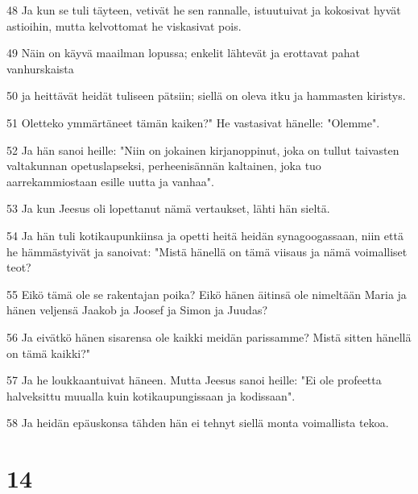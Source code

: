 \par 48 Ja kun se tuli täyteen, vetivät he sen rannalle, istuutuivat ja kokosivat hyvät astioihin, mutta kelvottomat he viskasivat pois.
\par 49 Näin on käyvä maailman lopussa; enkelit lähtevät ja erottavat pahat vanhurskaista
\par 50 ja heittävät heidät tuliseen pätsiin; siellä on oleva itku ja hammasten kiristys.
\par 51 Oletteko ymmärtäneet tämän kaiken?" He vastasivat hänelle: "Olemme".
\par 52 Ja hän sanoi heille: "Niin on jokainen kirjanoppinut, joka on tullut taivasten valtakunnan opetuslapseksi, perheenisännän kaltainen, joka tuo aarrekammiostaan esille uutta ja vanhaa".
\par 53 Ja kun Jeesus oli lopettanut nämä vertaukset, lähti hän sieltä.
\par 54 Ja hän tuli kotikaupunkiinsa ja opetti heitä heidän synagoogassaan, niin että he hämmästyivät ja sanoivat: "Mistä hänellä on tämä viisaus ja nämä voimalliset teot?
\par 55 Eikö tämä ole se rakentajan poika? Eikö hänen äitinsä ole nimeltään Maria ja hänen veljensä Jaakob ja Joosef ja Simon ja Juudas?
\par 56 Ja eivätkö hänen sisarensa ole kaikki meidän parissamme? Mistä sitten hänellä on tämä kaikki?"
\par 57 Ja he loukkaantuivat häneen. Mutta Jeesus sanoi heille: "Ei ole profeetta halveksittu muualla kuin kotikaupungissaan ja kodissaan".
\par 58 Ja heidän epäuskonsa tähden hän ei tehnyt siellä monta voimallista tekoa.

\chapter{14}

